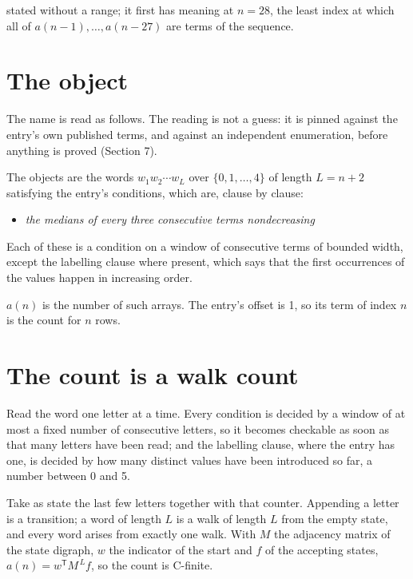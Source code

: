 \documentclass[11pt]{article}
\theoremstyle{definition}
\begin{document}
stated without a range; it first has meaning at $n = 28$, the least index at which all of $a(n-1),\dots,a(n-27)$ are terms of the sequence.

\section{The object}

The name is read as follows. The reading is not a guess: it is pinned against the entry's own published terms, and against an independent enumeration, before anything is proved (Section 7).

The objects are the words $w_1 w_2 \cdots w_L$ over $\{0,1,\dots,4\}$ of length $L = n + 2$ satisfying the entry's conditions, which are, clause by clause:

\begin{itemize}

\item {\itshape the medians of every three consecutive terms nondecreasing}

\end{itemize}

Each of these is a condition on a window of consecutive terms of bounded width, except the labelling clause where present, which says that the first occurrences of the values happen in increasing order.

$a(n)$ is the number of such arrays. The entry's offset is 1, so its term of index $n$ is the count for $n$ rows.

\section{The count is a walk count}

Read the word one letter at a time. Every condition is decided by a window of at most a fixed number of consecutive letters, so it becomes checkable as soon as that many letters have been read; and the labelling clause, where the entry has one, is decided by how many distinct values have been introduced so far, a number between $0$ and 5.

Take as state the last few letters together with that counter. Appending a letter is a transition; a word of length $L$ is a walk of length $L$ from the empty state, and every word arises from exactly one walk. With $M$ the adjacency matrix of the state digraph, $w$ the indicator of the start and $f$ of the accepting states, $a(n) = w^{\mathsf T}M^{\,L}f$, so the count is C-finite.
\end{document}
